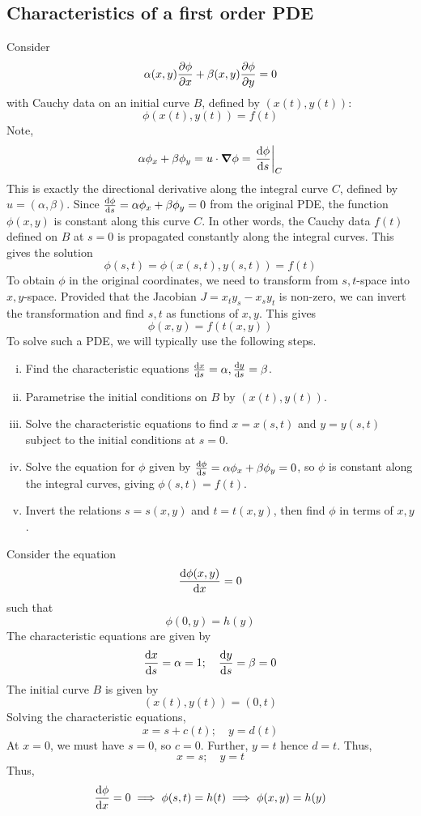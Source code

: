 \subsection{Characteristics of a first order PDE}
Consider
\[
	\alpha(x,y) \pdv{\phi}{x} + \beta(x,y) \pdv{\phi}{y} = 0
\]
with Cauchy data on an initial curve \( B \), defined by \( (x(t), y(t)) \):
\[
	\phi(x(t), y(t)) = f(t)
\]
Note,
\[
	\alpha \phi_x + \beta \phi_y = u \cdot \grad{\phi} = \eval{\dv{\phi}{s}}_C
\]
This is exactly the directional derivative along the integral curve \( C \), defined by \( u = (\alpha, \beta) \).
Since \( \dv{\phi}{s} = \alpha \phi_x + \beta \phi_y = 0 \) from the original PDE, the function \( \phi(x,y) \) is constant along this curve \( C \).
In other words, the Cauchy data \( f(t) \) defined on \( B \) at \( s = 0 \) is propagated constantly along the integral curves.
This gives the solution
\[
	\phi(s,t) = \phi(x(s,t), y(s,t)) = f(t)
\]
To obtain \( \phi \) in the original coordinates, we need to transform from \( s,t \)-space into \( x,y \)-space.
Provided that the Jacobian \( J = x_t y_s - x_s y_t \) is non-zero, we can invert the transformation and find \( s,t \) as functions of \( x,y \).
This gives
\[
	\phi(x,y) = f(t(x,y))
\]
To solve such a PDE, we will typically use the following steps.
\begin{enumerate}[(i)]
	\item Find the characteristic equations \( \dv{x}{s} = \alpha, \dv{y}{s} = \beta \).
	\item Parametrise the initial conditions on \( B \) by \( (x(t), y(t)) \).
	\item Solve the characteristic equations to find \( x = x(s,t) \) and \( y = y(s,t) \) subject to the initial conditions at \( s = 0 \).
	\item Solve the equation for \( \phi \) given by \( \dv{\phi}{s} = \alpha \phi_x + \beta \phi_y = 0 \), so \( \phi \) is constant along the integral curves, giving \( \phi(s,t) = f(t) \).
	\item Invert the relations \( s = s(x,y) \) and \( t = t(x,y) \), then find \( \phi \) in terms of \( x,y \).
\end{enumerate}
\begin{example}
	Consider the equation
	\[
		\dv{\phi(x,y)}{x} = 0
	\]
	such that
	\[
		\phi(0,y) = h(y)
	\]
	The characteristic equations are given by
	\[
		\dv{x}{s} = \alpha = 1;\quad \dv{y}{s} = \beta = 0
	\]
	The initial curve \( B \) is given by
	\[
		(x(t), y(t)) = (0,t)
	\]
	Solving the characteristic equations,
	\[
		x = s + c(t);\quad y = d(t)
	\]
	At \( x = 0 \), we must have \( s = 0 \), so \( c = 0 \).
	Further, \( y = t \) hence \( d = t \).
	Thus,
	\[
		x = s;\quad y = t
	\]
	Thus,
	\[
		\dv{\phi}{x} = 0 \implies \phi(s,t) = h(t) \implies \phi(x,y) = h(y)
	\]
\end{example}
